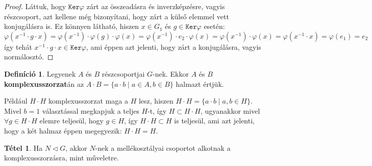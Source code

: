 \documentclass[12pt]{book}
\theoremstyle{plain} %
\theoremstyle{definition} %
\newtheorem{defi/}{Definíció}[section]
\newenvironment{defi}
  {\renewcommand{\qedsymbol}{$\clubsuit$}%
   \pushQED{\qed}\begin{defi/}}
  {\popQED\end{defi/}}
\newtheorem{theo/}{Tétel}[section]
\newenvironment{theo}
  {\renewcommand{\qedsymbol}{$\clubsuit$}%
   \pushQED{\qed}\begin{theo/}}
  {\popQED\end{theo/}}
\theoremstyle{remark}
\renewcommand\qedsymbol{$\blacksquare$}
\numberwithin{equation}{section}  %
\begin{document}
	\begin{proof}
		Láttuk, hogy $\mathtt{Ker}\varphi$ zárt az összeadásra és inverzképzésre, vagyis részcsoport, azt kellene még bizonyítani, hogy zárt a külső elemmel vett konjugálásra is. Ez könnyen látható, hiszen $x\in G_1$ és $g\in \mathtt{Ker}\varphi$ esetén:
		\[ \varphi(x^{-1}\cdot g \cdot x) = \varphi(x^{-1}) \cdot \varphi(g) \cdot \varphi(x) = \varphi(x^{-1}) \cdot e_2 \cdot \varphi(x) = \varphi(x^{-1}) \cdot \varphi(x) = \varphi(x^{-1}\cdot x) = \varphi(e_1) = e_2  \]
		így tehát $x^{-1}\cdot g \cdot x\in \mathtt{Ker}\varphi$, ami éppen azt jelenti, hogy zárt a konjugálásra, vagyis normálosztó.
	\end{proof}

	\begin{defi}
		Legyenek $A$ és $B$ részcsoportjai $G$-nek. Ekkor $A$ és $B$ \textbf{komplexusszorzat}án az $A\cdot B = \{ a\cdot b \mid a\in A, b\in B \} $ halmazt értjük. %
	\end{defi}

	Például $H\cdot H$ komplexusszorzat maga a $H$ lesz, hiszen $H\cdot H = \{ a\cdot b \mid a,b\in H  \}$. Mivel $b=1$ választással megkapjuk a teljes $H$-t, így $H \subset H\cdot H$, ugyanakkor mivel $\forall g\in H\cdot H$ elemre teljesül, hogy $g\in H$, így $H\cdot H \subset H$ is teljesül, ami azt jelenti, hogy a két halmaz éppen megegyezik: $H\cdot H = H$.

	\begin{theo}
		Ha $N\triangleleft G$, akkor $N$-nek a mellékosztályai csoportot alkotnak a komplexusszorzásra, mint műveletre.
	\end{theo}
\end{document}
